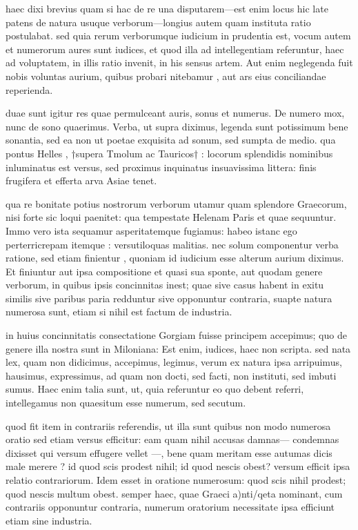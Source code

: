  haec dixi brevius quam si hac de re una disputarem—est enim locus hic late patens de natura usuque verborum—longius autem quam instituta ratio postulabat. sed quia rerum verborumque iudicium in prudentia est, vocum autem et numerorum aures sunt iudices, et quod illa ad intellegentiam referuntur, haec ad voluptatem, in illis ratio invenit, in his sensus artem. Aut enim neglegenda fuit nobis voluntas aurium, quibus probari nitebamur , aut ars eius conciliandae reperienda.

 duae sunt igitur res quae permulceant auris, sonus et numerus. De numero mox, nunc de sono quaerimus. Verba, ut supra diximus, legenda sunt potissimum bene sonantia, sed ea non ut poetae exquisita ad sonum, sed sumpta de medio. qua pontus Helles , †supera Tmolum ac Tauricos† : locorum splendidis nominibus inluminatus est versus, sed proximus inquinatus insuavissima littera: finis frugifera et efferta arva Asiae tenet.

 qua re bonitate potius nostrorum verborum utamur quam splendore Graecorum, nisi forte sic loqui paenitet: qua tempestate Helenam Paris et quae sequuntur. Immo vero ista sequamur asperitatemque fugiamus: habeo istanc ego perterricrepam itemque : versutiloquas malitias. nec solum componentur verba ratione, sed etiam finientur , quoniam id iudicium esse alterum aurium diximus. Et finiuntur aut ipsa compositione et quasi sua sponte, aut quodam genere verborum, in quibus ipsis concinnitas inest; quae sive casus habent in exitu similis sive paribus paria redduntur sive opponuntur contraria, suapte natura numerosa sunt, etiam si nihil est factum de industria.

 in huius concinnitatis consectatione Gorgiam fuisse principem accepimus; quo de genere illa nostra sunt in Miloniana: Est enim, iudices, haec non scripta. sed nata lex, quam non didicimus, accepimus, legimus, verum ex natura ipsa arripuimus, hausimus, expressimus, ad quam non docti, sed facti, non instituti, sed imbuti sumus. Haec enim talia sunt, ut, quia referuntur eo quo debent referri, intellegamus non quaesitum esse numerum, sed secutum.

 quod fit item in contrariis referendis, ut illa sunt quibus non modo numerosa oratio sed etiam versus efficitur: eam quam nihil accusas damnas— condemnas dixisset qui versum effugere vellet —, bene quam meritam esse autumas dicis male merere ? id quod scis prodest nihil; id quod nescis obest? versum efficit ipsa relatio contrariorum. Idem esset in oratione numerosum: quod scis nihil prodest; quod nescis multum obest. semper haec, quae Graeci a)nti/qeta nominant, cum contrariis opponuntur contraria, numerum oratorium necessitate ipsa efficiunt etiam sine industria.

